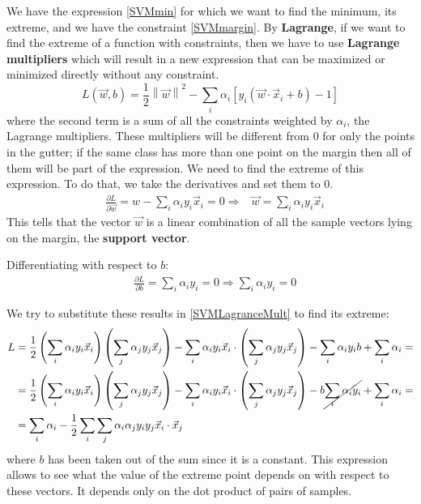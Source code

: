 \documentclass[12pt, letterpaper]{article}
\theoremstyle{definition}
\newcommand\norm[1]{\left\lVert#1\right\rVert}
\let\tb\textbf
\begin{document}
We have the expression \ref{SVMmin} for which we want to find the minimum, its extreme, and we have the constraint \ref{SVMmargin}. By \tb{Lagrange}, if we want to find the extreme of a function with constraints, then we have to use \tb{Lagrange multipliers} which will result in a new expression that can be maximized or minimized directly without any constraint. 
\begin{equation}
L(\vec{w}, b) = \frac{1}{2}\norm{\vec{w}}^2 - \sum_i \alpha_i\left[ y_i\left( \vec{w}\cdot \vec{x}_i+b\right)-1\right]
\label{SVMLagranceMult}
\end{equation}
where the second term is a sum of all the constraints weighted by $\alpha_i$, the Lagrange multipliers. These multipliers will be different from $0$ for only the points in the gutter; if the same class has more than one point on the margin then all of them will be part of the expression. We need to find the extreme of this expression. To do that, we take the derivatives and set them to $0$.
\begin{equation}
\begin{aligned}
&\frac{\partial L}{\partial \vec{w}} = w - \sum_i \alpha_i y_i \vec{x}_i = 0 \Rightarrow &\vec{w} = \sum_i \alpha_i y_i \vec{x}_i
\end{aligned}
\label{SVMLagrDevw}
\end{equation}
This tells that the vector $\vec{w}$ is a linear combination of all the sample vectors lying on the margin, the \tb{support vector}.

Differentiating with respect to $b$:
\begin{equation}
\begin{aligned}
&\frac{\partial L}{\partial b} = \sum_i \alpha_i y_i = 0 \Rightarrow \sum_i \alpha_i y_i = 0
\end{aligned}
\label{SVMLagrDevb}
\end{equation}

We try to substitute these results in \ref{SVMLagranceMult} to find its extreme:
\begin{equation}
\begin{aligned}
L &= \frac{1}{2} \left(  \sum_i \alpha_i y_i \vec{x}_i\right) \left( \sum_j \alpha_j y_j \vec{x}_j\right) - \sum_i \alpha_i y_i \vec{x}_i \cdot\left(\sum_j \alpha_j y_j \vec{x}_j\right) -\sum_i \alpha_i y_i b + \sum_i \alpha_i =\\
& = \frac{1}{2} \left(  \sum_i \alpha_i y_i \vec{x}_i\right) \left( \sum_j \alpha_j y_j \vec{x}_j\right) - \sum_i \alpha_i y_i \vec{x}_i \cdot\left(\sum_j \alpha_j y_j \vec{x}_j\right) -b \cancel{\sum_i \alpha_i y_i} + \sum_i \alpha_i  =\\
&= \sum_i \alpha_i - \frac{1}{2}\sum_i \sum_j \alpha_i \alpha_j y_i y_j \vec{x}_i \cdot \vec{x}_j 
\end{aligned}
\end{equation}
where $b$ has been taken out of the sum since it is a constant. This expression allows to see what the value of the extreme point depends on with respect to these vectors. It depends only on the dot product of pairs of samples.
\end{document}
